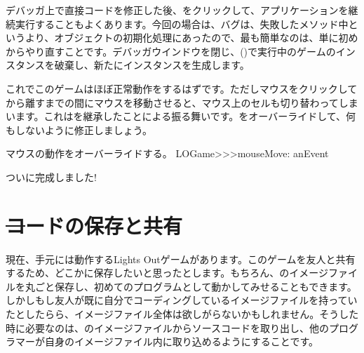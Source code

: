 \documentclass[a4paper,10pt,twoside]{book}
\begin{document}
デバッガ上で直接コードを修正した後、をクリックして、アプリケーションを継続実行することもよくあります。今回の場合は、バグは、失敗したメソッド中というより、オブジェクトの初期化処理にあったので、最も簡単なのは、単に初めからやり直すことです。デバッガウインドウを閉じ、()で実行中のゲームのインスタンスを破棄し、新たにインスタンスを生成します。



これでこのゲームはほぼ正常動作をするはずです。ただしマウスをクリックしてから離すまでの間にマウスを移動させると、マウス上のセルも切り替わってしまいます。これはを継承したことによる振る舞いです。をオーバーライドして、何もしないように修正しましょう。

\begin{method}[mouseMove:]{マウスの動作をオーバーライドする。}
LOGame>>>mouseMove: anEvent
\end{method}

ついに完成しました!


\section{\st コードの保存と共有}

現在、手元には動作するLights Outゲームがあります。このゲームを友人と共有するため、どこかに保存したいと思ったとします。もちろん、\pharo のイメージファイルを丸ごと保存し、初めてのプログラムとして動かしてみせることもできます。しかしもし友人が既に自分でコーディングしているイメージファイルを持っていたとしたらら、イメージファイル全体は欲しがらないかもしれません。そうした時に必要なのは、\pharo のイメージファイルからソースコードを取り出し、他のプログラマーが自身のイメージファイル内に取り込めるようにすることです。
\end{document}
